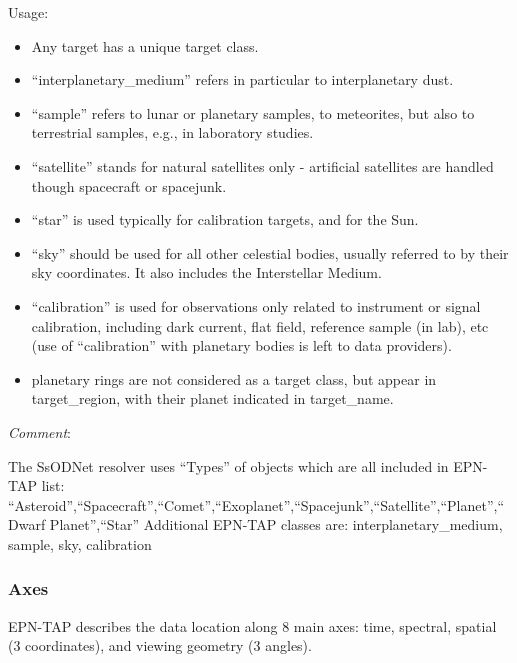 \documentclass[11pt,a4paper]{ivoa}
\begin{document}
Usage:

\begin{itemize}

\item Any target has a unique target class.

\item ``interplanetary\_medium'' refers in particular to interplanetary dust.

\item ``sample'' refers to lunar or planetary samples, to meteorites, but also to terrestrial samples, e.g., in laboratory studies.

\item ``satellite'' stands for natural satellites only - artificial satellites are handled though spacecraft or spacejunk.

\item ``star'' is used typically for calibration targets, and for the Sun.

\item ``sky'' should be used for all other celestial bodies, usually referred to by their sky coordinates. It also includes the Interstellar Medium.

\item ``calibration'' is used for observations only related to instrument or signal calibration, including dark current, flat field, reference sample (in lab), etc (use of ``calibration'' with planetary bodies is left to data providers).

\item planetary rings are not considered as a target class, but appear in target\_region, with their planet indicated in target\_name.

\end{itemize}

\emph{Comment}: 

The SsODNet resolver uses ``Types'' of objects which are all included in EPN-TAP list: ``Asteroid'',``Spacecraft'',``Comet'',``Exoplanet'',``Spacejunk'',``Satellite'',``Planet'',``Dwarf Planet'',``Star'' Additional EPN-TAP classes are: interplanetary\_medium, sample, sky, calibration \\

\subsubsection{Axes \\}

EPN-TAP describes the data location along 8 main axes: time, spectral, spatial (3 coordinates), and viewing geometry (3 angles). 
\end{document}
